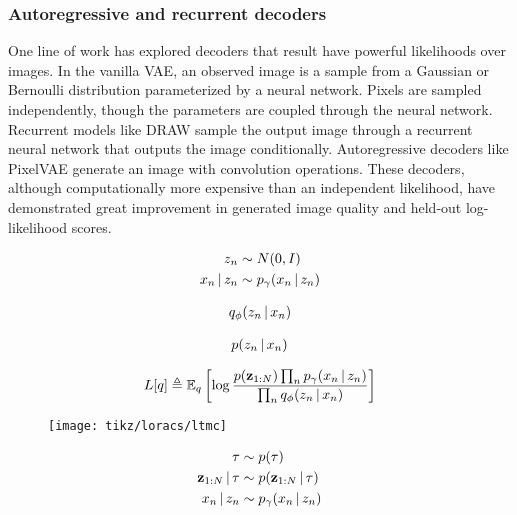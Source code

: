 \subsubsection{Autoregressive and recurrent decoders}
One line of work has explored
decoders that result have powerful
likelihoods over images.
In the vanilla VAE, an observed image
is a sample 
from a Gaussian 
or Bernoulli distribution
parameterized by a neural network.
Pixels are sampled independently,
though the parameters are coupled
through the neural network.
Recurrent models like 
DRAW \citep{Gregor2015}
sample the output image
through a recurrent
neural network that outputs
the image conditionally.
Autoregressive decoders
like PixelVAE \citep{Gulrajani2016}
generate an image with convolution
operations.
These decoders, although
computationally more
expensive than an independent likelihood,
have demonstrated great improvement in
generated image quality and 
held-out log-likelihood scores.


\iffalse

\begin{align*}
    z_n &\sim N(0, I) \\
    x_n \,|\, z_n &\sim p_\gamma(x_n \,|\, z_n)
\end{align*}

\begin{align*}
  q_\phi(z_n \,|\, x_n)
\end{align*}

\begin{align*}
  p(z_n \,|\, x_n)
\end{align*}

\begin{align*}
  L[q] \triangleq \mathbb{E}_q\left[\log \frac{p(\mathbf{z}_{1:N})\prod_n p_\gamma(x_n \,|\, z_n)}{\prod_n q_\phi(z_n \,|\, x_n)}\right]
\end{align*}

\begin{figure}
    \texttt{[image: tikz/loracs/ltmc]}
\end{figure}

\begin{align*}
    \tau &\sim p(\tau) \\
    \mathbf{z}_{1:N} \,|\, \tau &\sim p(\mathbf{z}_{1:N} \,|\, \tau) \\
    x_n \,|\, z_n &\sim p_\gamma(x_n \,|\, z_n)
\end{align*}

